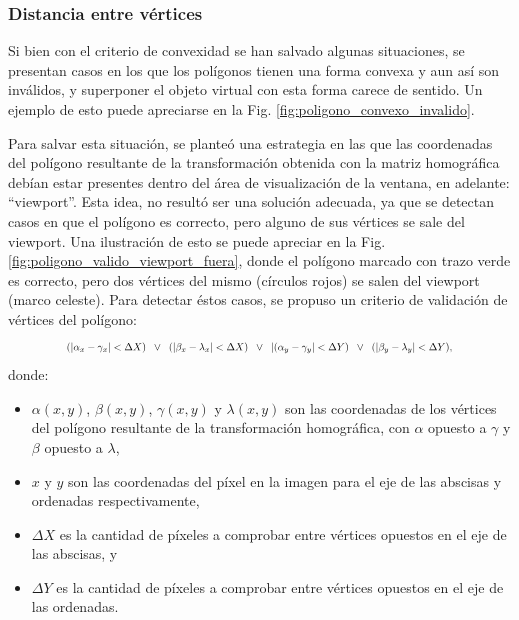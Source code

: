 \subsubsection{Distancia entre vértices}
Si bien con el criterio de convexidad se han salvado algunas situaciones, se presentan casos en los que los polígonos tienen una forma convexa y aun así son inválidos, y superponer el objeto virtual con esta forma carece de sentido. Un ejemplo de esto puede apreciarse en la Fig. \ref{fig:poligono_convexo_invalido}. 

Para salvar esta situación, se planteó una estrategia en las que las coordenadas del polígono resultante de la transformación obtenida con la matriz homográfica debían estar presentes dentro del área de visualización de la ventana, en adelante: ``viewport''. Esta idea, no resultó ser una solución adecuada, ya que se detectan casos en que el polígono es correcto, pero alguno de sus vértices se sale del viewport. %
Una ilustración de esto se puede apreciar en la Fig. \ref{fig:poligono_valido_viewport_fuera}, donde el polígono marcado con trazo verde es correcto, pero dos vértices del mismo (círculos rojos) se salen del viewport (marco celeste). %
Para detectar éstos casos, se propuso un criterio de validación de vértices del polígono:
\begin{equation}
\resizebox{.8\hsize}{!}{$(| \alpha_x - \gamma_x| < \Delta X) \;\;\vee \;\;(| \beta_x - \lambda_x | < \Delta X) \;\;\vee \;\;| (\alpha_y - \gamma_y | < \Delta Y) \;\;\vee \;\;(|\beta_y - \lambda_y |< \Delta Y),$}
\label{eq:expresion_validacion_vertices}
\end{equation}
donde:
\begin{itemize}
 \item $\alpha(x,y)$, $\beta(x,y)$, $\gamma(x,y)$ y $\lambda(x,y)$ son las coordenadas de los vértices del polígono resultante de la transformación homográfica, con $\alpha$ opuesto a $\gamma$ y $\beta$ opuesto a $\lambda$,
 \item $x$ y $y$ son las coordenadas del píxel en la imagen para el eje de las abscisas y ordenadas respectivamente,
 \item $\Delta X$ es la cantidad de píxeles a comprobar entre vértices opuestos en el eje de las abscisas, y
 \item $\Delta Y$ es la cantidad de píxeles a comprobar entre vértices opuestos en el eje de las ordenadas.
\end{itemize}

